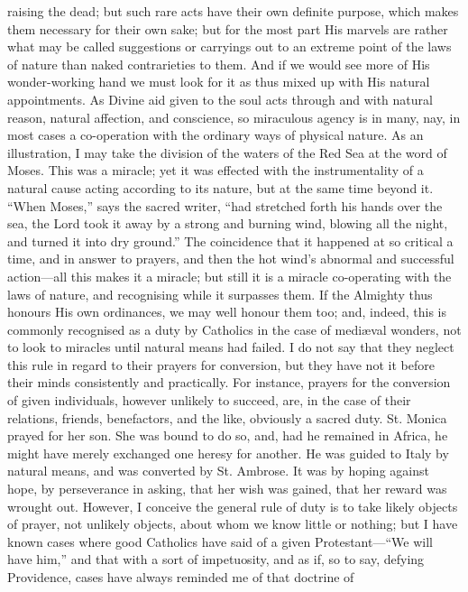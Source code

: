 raising the dead; but such rare acts have their own definite purpose,
which makes them necessary for their own sake; but for the most part
His marvels are rather what may be called suggestions or carryings out
to an extreme point of the laws of nature than naked contrarieties to
them. And if we would see more of His wonder-working hand we must look
for it as thus mixed up with His natural appointments. As Divine aid
given to the soul acts through and with natural reason, natural
affection, and conscience, so miraculous agency is in many, nay, in
most cases a co-operation with the ordinary ways of physical nature.
As an illustration, I may take the division of the waters of the Red
Sea at the word of Moses. This was a miracle; yet it was effected with
the instrumentality of a natural cause acting according to its nature,
but at the same time beyond it. ``When Moses,'' says the sacred writer, ``had
stretched forth his hands over the sea, the Lord took it away by a
strong and burning wind, blowing all the night, and turned it into dry
ground.'' The coincidence that it happened at so critical a time, and
in answer to prayers, and then the hot wind's abnormal and successful
action—all this makes it a miracle; but still it is a miracle
co-operating with the laws of nature, and recognising while it
surpasses them. If the Almighty thus honours His own ordinances,
we may well honour them too; and, indeed, this is commonly recognised
as a duty by Catholics in the case of mediæval wonders, not to look
to miracles until natural means had failed. I do not say that they
neglect this rule in regard to their prayers for conversion, but they
have not it before their minds consistently and practically. For
instance, prayers for the conversion of given individuals, however
unlikely to succeed, are, in the case of their relations, friends,
benefactors, and the like, obviously a sacred duty. St. Monica prayed
for her son. She was bound to do so, and, had he remained in Africa,
he might have merely exchanged one heresy for another. He was guided
to Italy by natural means, and was converted by St. Ambrose. It was by
hoping against hope, by perseverance in asking, that her wish was
gained, that her reward was wrought out. However, I conceive the
general rule of duty is to take likely objects of prayer, not unlikely
objects, about whom we know little or nothing; but I have known cases
where good Catholics have said of a given Protestant—``We will have
him,'' and that with a sort of impetuosity, and as if, so to say,
defying Providence, cases have always reminded me of that doctrine of
